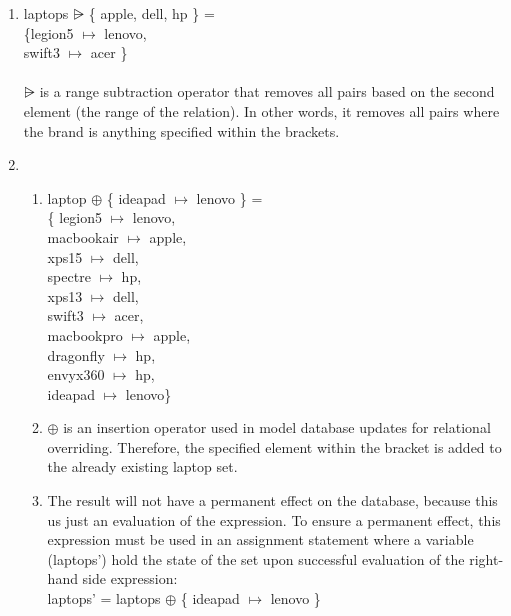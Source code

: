 \begin{enumerate}
\item laptops $\nrres$ \{ apple, dell, hp \} = \\
\{legion5 $\mapsto$ lenovo, \\
swift3 $\mapsto$ acer \}
\\ \\
$\nrres$ is a range subtraction operator that removes all pairs based on the second element (the range of the relation). In other words, it removes all pairs where the brand is anything specified within the brackets. \\

\item 
\begin {enumerate} 
\item laptop $\oplus$ \{ ideapad $\mapsto$ lenovo \} = \\
\{ legion5 $\mapsto$ lenovo, \\
macbookair $\mapsto$ apple, \\
xps15 $\mapsto$ dell, \\
spectre $\mapsto$ hp, \\
xps13 $\mapsto$ dell, \\
swift3 $\mapsto$ acer, \\
macbookpro $\mapsto$ apple, \\
dragonfly $\mapsto$ hp, \\
envyx360 $\mapsto$ hp, \\
ideapad $\mapsto$ lenovo\} \\

\item $\oplus$ is an insertion operator used in model database updates for relational overriding. Therefore, the specified element within the bracket is added to the already existing laptop set. \\

\item The result will not have a permanent effect on the database, because this us just an  evaluation of the expression. To ensure a permanent effect, this expression must be used in an assignment statement where a variable (laptops') hold the state of the set upon successful evaluation of the right-hand side expression: \\
laptops' = laptops $\oplus$ \{ ideapad $\mapsto$ lenovo \}
\end{enumerate}

\end{enumerate}

